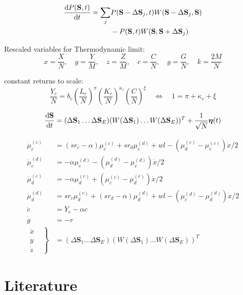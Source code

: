 \begin{align}
	\frac{{\rm d} P(\mathbf{S}, t)}{{\rm d} t} = \sum_{j} &P(\mathbf{S} - \Delta \mathbf{S}_j, t) W(\mathbf{S} - \Delta \mathbf{S}_j,\mathbf{S}) \nonumber \\
	&- P(\mathbf{S}, t) W(\mathbf{S},\mathbf{S} + \Delta \mathbf{S}_j) \nonumber
\end{align}

Rescaled variables for Thermodynamic limit:
\begin{equation}
	x = \frac{X}{N}, \quad y = \frac{Y}{M}, \quad z = \frac{Z}{M}, \quad c = \frac{C}{N}, \quad g = \frac{G}{N}, \quad k = \frac{2M}{N}
\end{equation}

constant returns to scale:
\begin{equation}
	\frac{Y_c}{N} = b_c\left( \frac{L_c}{N} \right)^{\pi}\left( \frac{K_c}{N} \right)^{\kappa_c}\left( \frac{C}{N} \right)^{\xi} \quad \Leftrightarrow \quad 1 = \pi + \kappa_c + \xi
\end{equation}

\begin{equation}
	\frac{{\rm d} \mathbf{S} }{{\rm d} t} = (\Delta \mathbf{S}_1 \dots \Delta \mathbf{S}_E) (W(\Delta \mathbf{S}_1) \dots  W(\Delta \mathbf{S}_E))^{T} + \frac{1}{\sqrt{N}} \boldsymbol{\eta}(t)
\end{equation}

\begin{align}
	\dot{\mu}_c^{(c)} &= (sr_c - \alpha)\mu_c^{(c)} + s r_d \mu_c^{(d)} + w l - (\mu_d^{(c)} - \mu_c^{(c)})\dot{x}/2 \nonumber \\
	\dot{\mu}_c^{(d)} &= - \alpha\mu_c^{(d)} - (\mu_d^{(d)} - \mu_c^{(d)})\dot{x}/2\nonumber \\
	\dot{\mu}_d^{(c)} &= - \alpha\mu_d^{(c)} + (\mu_c^{(c)} - \mu_d^{(c)})\dot{x}/2\nonumber \\
	\dot{\mu}_d^{(d)} &= sr_c \mu_d^{(c)} + (s r_d - \alpha)\mu_d^{(d)} + w l - (\mu_c^{(d)} - \mu_d^{(d)})\dot{x}/2\nonumber \\
	\dot{c} &= Y_c - \alpha c\nonumber \\
	\dot{g} &= -r \nonumber \\
	\left. \begin{aligned} 
		\dot{x} & \\
		\dot{y} & \\
		\dot{z} & 
	\end{aligned} \right\} &=(\Delta \mathbf{S}_1 \dots \Delta \mathbf{S}_E) (W(\Delta \mathbf{S}_1) \dots  W(\Delta \mathbf{S}_E))^{T}
\end{align}


\section{Literature}

{}
    

